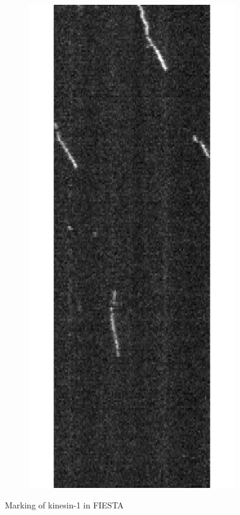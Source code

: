 \documentclass[english, %
parskip=full, %
bibliography=totoc, %
]{scrartcl}
\begin{document}
\begin{figure}[!hb]
\begin{subfigure}[b]{0.4\textwidth}
	\end{subfigure}
	\begin{subfigure}[b]{0.4\textwidth}
	   \includegraphics[width=\textwidth]{Auswertungsbild_unten}
	\end{subfigure}
  \caption{Marking of kinesin-1 in FIESTA}
	\label{fig:kmarking}
\end{figure}
\end{document}
